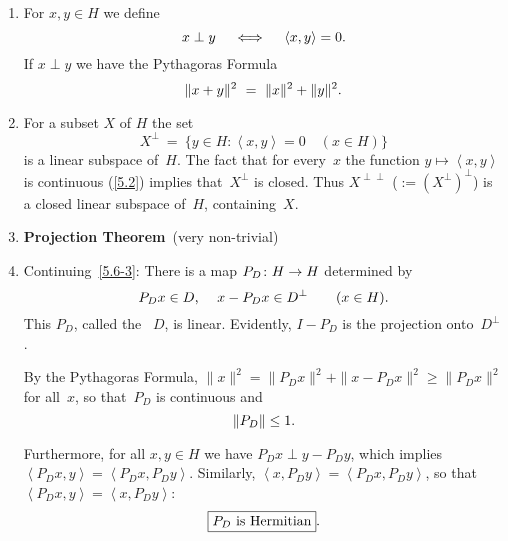 \documentclass[main.tex]{subfiles}
\begin{document}
\begin{psec}{5.6}%
\begin{enumerate}
\item \label{5.6-1}
For $x,y\in H$ we define
\begin{equation*}
x\perp y \quad \iff \quad \left<x,y\right>=0\text{.}
\end{equation*}
If $x\perp y$ we have the Pythagoras Formula
\begin{equation*}
\|x+y\|^2\ =\ \|x\|^2 + \|y\|^2\htam{.}
\end{equation*}
%
\item \label{5.6-2}
For a subset $X$ of $H$ the set
\begin{equation*}
X^\perp\ =\ \bigl\{ y\in H\colon \left<x,y\right>=0\quad(x\in H)\bigr\}
\end{equation*}
is a linear subspace of~$H$.
The fact that for every~$x$
the function $y\mapsto\left<x,y\right>$
is continuous (\ref{5.2}) 
implies that~$X^\perp$ is closed.
Thus $X^{\perp\perp}$ ($:=(X^\perp)^\perp$)
is a closed linear subspace of~$H$, containing~$X$.
%
\item \label{5.6-3}
\textbf{Projection Theorem}\  (very non-trivial)
%
\item \label{5.6-4}
Continuing~\ref{5.6-3}:
There is a map $P_D\colon H\rightarrow H$ determined by
\begin{equation*}
P_D x\in D\text{, }\quad x-P_Dx\in D^\perp\qquad (x\in H)\text{.}
\end{equation*}
This $P_D$,
called the ~$D$,
is linear.
Evidently,
$I-P_D$ is the projection onto~$D^\perp$.

By the Pythagoras Formula,
$\|x\|^2 = \|P_D x\|^2 + \|x-P_Dx\|^2 \geq\|P_D x\|^2$
for all~$x$,
so that~$P_D$ is continuous and
\begin{equation*}
\| P_D \| \leq 1\text{.}
\end{equation*}

Furthermore,
for all $x,y\in H$
we have $P_D x\perp y-P_D y$,
which implies $\left<P_D x,y\right>=\left<P_Dx,P_Dy\right>$.
Similarly, $\left<x,P_Dy\right>=\left<P_Dx,P_Dy\right>$,
so that $\left<P_Dx,y\right>=\left<x,P_Dy\right>$:
\begin{equation*}
\fbox{$ P_D \text{ is Hermitian} $}\text{.}
\end{equation*}
\end{enumerate}
\end{psec}
\end{document}
